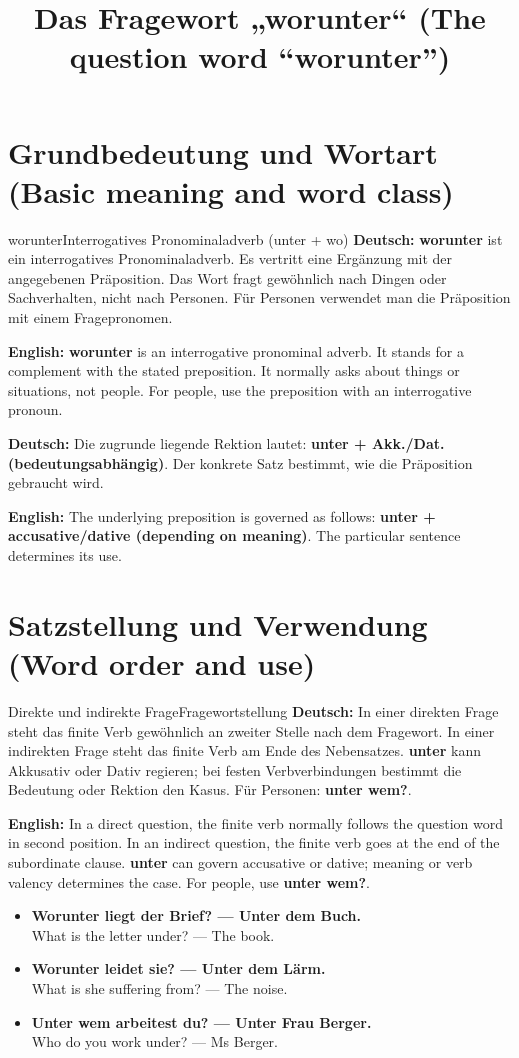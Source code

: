 \documentclass[a4paper,11pt]{article}
\title{Das Fragewort „worunter“ (The question word “worunter”)}
\date{}
\newcommand{\GermanText}[1]{\textbf{Deutsch: }#1\par}
\newcommand{\EnglishText}[1]{{\small\color{SoftGray}\textbf{English: }#1\par}}
\newcommand{\ExampleItem}[2]{\item \textbf{#1}\\{\small\color{SoftGray}#2}}
\begin{document}
\maketitle
\tableofcontents
\newpage
\section{Grundbedeutung und Wortart (Basic meaning and word class)}
\begin{grammarentry}{worunter}{Interrogatives Pronominaladverb (unter + wo)}
\GermanText{\textbf{worunter} ist ein interrogatives Pronominaladverb. Es vertritt eine Ergänzung mit der angegebenen Präposition. Das Wort fragt gewöhnlich nach Dingen oder Sachverhalten, nicht nach Personen. Für Personen verwendet man die Präposition mit einem Fragepronomen.}
\EnglishText{\textbf{worunter} is an interrogative pronominal adverb. It stands for a complement with the stated preposition. It normally asks about things or situations, not people. For people, use the preposition with an interrogative pronoun.}
\GermanText{Die zugrunde liegende Rektion lautet: \textbf{unter + Akk./Dat. (bedeutungsabhängig)}. Der konkrete Satz bestimmt, wie die Präposition gebraucht wird.}
\EnglishText{The underlying preposition is governed as follows: \textbf{unter + accusative/dative (depending on meaning)}. The particular sentence determines its use.}
\end{grammarentry}
\section{Satzstellung und Verwendung (Word order and use)}
\begin{grammarentry}{Direkte und indirekte Frage}{Fragewortstellung}
\GermanText{In einer direkten Frage steht das finite Verb gewöhnlich an zweiter Stelle nach dem Fragewort. In einer indirekten Frage steht das finite Verb am Ende des Nebensatzes. \textbf{unter} kann Akkusativ oder Dativ regieren; bei festen Verbverbindungen bestimmt die Bedeutung oder Rektion den Kasus. Für Personen: \textbf{unter wem?}.}
\EnglishText{In a direct question, the finite verb normally follows the question word in second position. In an indirect question, the finite verb goes at the end of the subordinate clause. \textbf{unter} can govern accusative or dative; meaning or verb valency determines the case. For people, use \textbf{unter wem?}.}
\end{grammarentry}
\begin{exbox}\begin{itemize}
\ExampleItem{Worunter liegt der Brief? — Unter dem Buch.}{What is the letter under? — The book.}
\ExampleItem{Worunter leidet sie? — Unter dem Lärm.}{What is she suffering from? — The noise.}
\ExampleItem{Unter wem arbeitest du? — Unter Frau Berger.}{Who do you work under? — Ms Berger.}
\end{itemize}\end{exbox}
\end{document}
